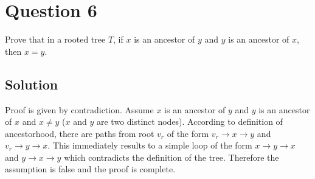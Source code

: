 
\section*{Question 6}
Prove that in a rooted tree $T$, if $x$ is an ancestor of $y$ and $y$ is an ancestor of $x$, then $x = y$.
\subsection*{Solution}
Proof is given by contradiction. Assume $x$ is an ancestor of $y$ and $y$ is an ancestor of $x$ and $x \neq y$ ($x$ and $y$ are two distinct nodes). According to definition of ancestorhood, there are paths from root $v_r$ of the form $v_r \rightarrow x \rightarrow y$ and $v_r \rightarrow y \rightarrow x$. This immediately results to a simple loop of the form $x \rightarrow y \rightarrow x$ and $y \rightarrow x \rightarrow y$ which contradicts the definition of the tree. Therefore the assumption is false and the proof is complete.
